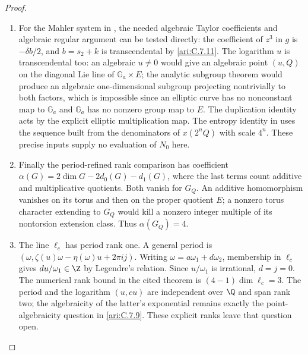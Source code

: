 \begin{proof}
\begin{enumerate}[label=\arabic*.,leftmargin=0pt,labelsep=.5em]
\begin{enumerate}[label=(\alph*),leftmargin=1.3em,labelsep=.5em]
\item  For the Mahler system in
\citep[Theorem~1.1 and system~(1.2), p.~56]{adamczewski2017mahler},
the needed algebraic Taylor coefficients and algebraic regular
argument can be tested directly: the coefficient of $z^3$ in
$g$ is $-\delta b/2$, and $b=s_2+k$ is transcendental by
\ref{ari:C.7.11}. The logarithm $u$ is transcendental too:
an algebraic $u\ne0$ would give an algebraic point $(u,Q)$
on the diagonal Lie line of $\mathbb G_a\times E$; the analytic
subgroup theorem would produce an algebraic one-dimensional
subgroup projecting nontrivially to both factors, which is
impossible since an elliptic curve has no nonconstant map to
$\mathbb G_a$ and $\mathbb G_a$ has no nonzero group map to $E$.
The duplication identity acts by the explicit elliptic
multiplication map. The entropy identity in
\citep[Theorem~5.1, author preprint, p.~9]{einsiedler2001entropy} uses the sequence
built from the denominators of $x(2^nQ)$ with scale $4^n$.
These precise inputs supply no evaluation of $N_0$ here.


\item  Finally the period-refined rank comparison
\citep[Theorem~4.1, pp.~385--386, and Corollary~4.3, p.~386]{waldschmidt1988periodrank}
\citep[main theorem,p.363]{roy1993periodrank}
has coefficient $\alpha(G)=2\dim G-2d_0(G)-d_1(G)$,
where the last terms count additive and multiplicative
quotients. Both vanish for $G_Q$. An additive homomorphism
vanishes on its torus and then on the proper quotient $E$;
a nonzero torus character extending to $G_Q$ would kill a
nonzero integer multiple of its nontorsion extension class.
Thus $\alpha(G_Q)=4$.


\item  The line $\ell_c$ has period rank one. A general period is
$(\omega,\zeta(u)\omega-\eta(\omega)u+2\pi i j)$.
Writing $\omega=a\omega_1+d\omega_2$, membership in
$\ell_c$ gives $du/\omega_1\in\Z$ by Legendre's relation.
Since $u/\omega_1$ is irrational, $d=j=0$. The numerical
rank bound in the cited theorem is
$(4-1)\dim\ell_c=3$. The period and the logarithm
$(u,cu)$ are independent over $\Q$ and span rank two;
the algebraicity of the latter's exponential remains exactly
the point-algebraicity question in \ref{ari:C.7.9}. These
explicit ranks leave that question open.


\end{enumerate}

\end{enumerate}
\end{proof}